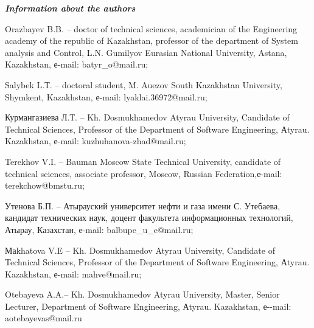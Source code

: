\emph{{\bfseries Information about the authors}}
\begin{noparindent}

Orazbayev B.B. \emph{--} doctor of technical sciences, academician of
the Engineering academy of the republic of Kazakhstan, professor of the
department of System analysis and Control, L.N. Gumilyov Eurasian
National University, Astana, Kazakhstan, е-mail: batyr\_o@mail.ru;

Salybek L.Т. -- doctoral student, M. Auezov South Kazakhstan University,
Shymkent, Kazakhstan, е-mail: lyaklai.36972@mail.ru;

Курмангазиева Л.Т. -- Kh. Dosmukhamedov Atyrau University, Candidate of
Technical Sciences, Professor of the Department of Software Engineering,
Аtyrau. Kazakhstan, е-mail: kuzhuhanova-zhad@mail.ru;

Terekhov V.I. -- Bauman Moscow State Technical University, candidate of
technical sciences, associate professor, Moscow, Russian
Federation,е-mail: terekchow@bmstu.ru;

Утенова Б.П. -- Атырауский университет нефти и газа имени С. Утебаева,
кандидат технических наук, доцент факультета информационных технологий,
Атырау, Казахстан, е-mail: balbupe\_u\_e@mail.ru;

Маkhatova V.E -- Kh. Dosmukhamedov Atyrau University, Candidate of
Technical Sciences, Professor of the Department of Software Engineering,
Аtyrau. Kazakhstan, е-mail: mahve@mail.ru;

Otebayeva A.A.-- Kh. Dosmukhamedov Atyrau University, Master, Senior
Lecturer, Department of Software Engineering, Аtyrau. Kazakhstan,
е-\/-mail: aotebayevas@mail.ru
\end{noparindent}
